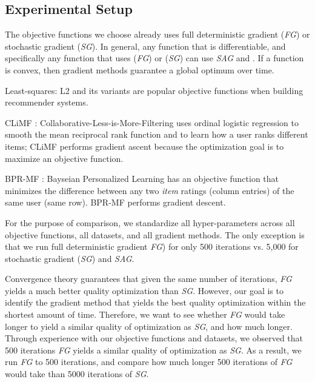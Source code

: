 \subsection{Experimental Setup}

The objective functions we choose already uses full deterministic gradient (\emph{FG}) or stochastic gradient (\emph{SG}).  
In general, any function that is differentiable, and specifically any function that uses (\emph{FG}) or (\emph{SG}) can use \emph{SAG} and \tool.
If a function is convex, then gradient methods guarantee a global optimum over time.
\begin{sloppy}
\begin{compactenum}
\item Least-squares: L2 and its variants \cite{mnar, wrmf2008hu, wrmf2008pan} are popular objective functions when building recommender systems.
\item CLiMF \cite{climf}: Collaborative-Less-is-More-Filtering uses ordinal logistic regression to smooth the mean reciprocal rank function and to learn how a user ranks different items; 
CLiMF performs gradient ascent because the optimization goal is to maximize an objective function.
\item BPR-MF \cite{bpr}: Bayseian Personalized Learning has an objective function that minimizes 
the difference between any two \emph{item} ratings (column entries) of the same user (same row).
BPR-MF performs gradient descent.
\end{compactenum}
\end{sloppy}




For the purpose of comparison, we standardize all hyper-parameters across all objective functions, all datasets, and all gradient methods.
The only exception is that we run full deterministic gradient \emph{FG}) for only 500 iterations vs. 5,000 for stochastic gradient (\emph{SG}) and \emph{SAG}.

Convergence theory guarantees that given the same number of iterations, \emph{FG} yields a much better quality optimization than \emph{SG}.
However, our goal is to identify the gradient method that yields the best quality optimization within the shortest amount of time.
Therefore, we want to see whether \emph{FG} would take longer to yield a similar quality of optimization as \emph{SG}, and how much longer.
Through experience with our objective functions and datasets, we observed that 500 iterations \emph{FG} yields a similar quality of optimization as \emph{SG}.
As a result, we run \emph{FG} to 500 iterations, and compare how much longer 500 iterations of \emph{FG} would take than 5000 iterations of \emph{SG}.

